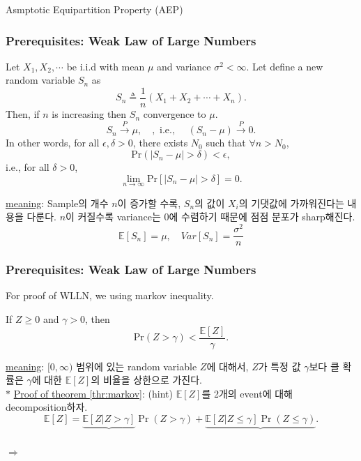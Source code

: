 \documentclass[9pt]{beamer}
\begin{document}
    \begin{section}{Asmptotic Equipartition Property (AEP)}
        \begin{frame}
            \frametitle{Prerequisites: Weak Law of Large Numbers}
            \begin{theorem}\label{thr:WLLN}
                Let $X_1, X_2, \cdots$ be i.i.d with mean $\mu$ and variance $\sigma^2 < \infty$. Let define a new random variable $S_n$ as
                $$S_n \triangleq \frac{1}{n} (X_1 + X_2 + \cdots + X_n).$$
                Then, if $n$ is increasing then $S_n$ convergence to $\mu$.
                $$ S_n \xrightarrow{P} \mu, \quad, \text { i.e., } \quad\left(S_n-\mu\right) \xrightarrow{P} 0 . $$
                In other words, for all $\epsilon, \delta >0$, there exists $N_0$ such that $\forall n > N_0$,
                $$\text{Pr}(|S_n - \mu| > \delta) < \epsilon,$$
                i.e., for all $\delta >0$, 
                $$\lim_{n \rightarrow \infty} \text{Pr} [|S_n - \mu| > \delta ]=0.$$
            \end{theorem}
            \checkmark \underline{meaning}:  Sample의 개수 $n$이 증가할 수록, $S_n$의 값이 $X_i$의 기댓값에 가까워진다는 내용을 다룬다. $n$이 커질수록 variance는 0에 수렴하기 때문에 점점 분포가 sharp해진다.
            $$ \mathbb E[S_n] = \mu, \quad  Var[S_n] = \frac{\sigma^2}{n}$$
        \end{frame}
        
        \begin{frame}
            \frametitle{Prerequisites: Weak Law of Large Numbers}
            For proof of WLLN, we using markov inequality.
            \begin{theorem}\label{thr:markov}
                If $Z \ge 0$ and $\gamma > 0$, then
                $$\text{Pr}(Z>\gamma) <  \frac{\mathbb E[Z]}{\gamma}.$$
            \end{theorem}
            \checkmark \underline{meaning}: $[0, \infty)$ 범위에 있는 random variable $Z$에 대해서, $Z$가 특정 값 $\gamma$보다 클 확률은 $\gamma$에 대한 $\mathbb E[Z]$의 비율을 상한으로 가진다.
            \vspace{0.3cm}
            \\$\ast$ \underline{Proof of theorem \ref{thr:markov}}: (hint) $\mathbb E[Z]$를 2개의 event에 대해 decomposition하자.
            $$ \mathbb{E}[Z]=\underbrace{\mathbb{E}[Z | Z>\gamma]}_{} \operatorname{Pr}(Z>\gamma)+\underbrace{\mathbb{E}[Z | Z \leq \gamma] \operatorname{Pr}(Z \leq \gamma)}_{}. $$
            \\$\Rightarrow$
            \vspace{0.5cm}


\end{frame}
\end{section}
\end{document}
